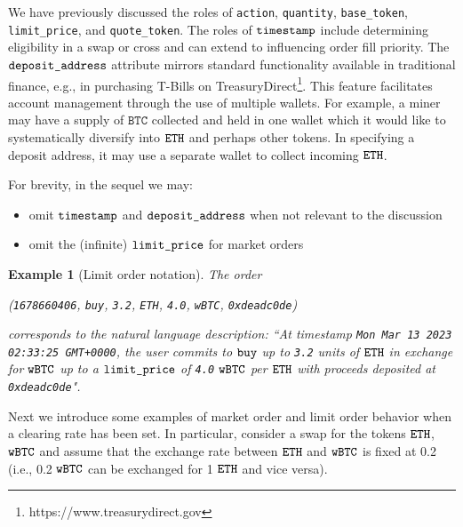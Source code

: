 \documentclass[11pt, reqno]{amsart}
\newtheorem{example}[thm]{Example}
\newcommand{\BTC}{\textnormal{\texttt{wBTC}}}
\newcommand{\ETH}{\textnormal{\texttt{ETH}}}
\newcommand{\timestamp}{\textnormal{\texttt{timestamp}}}
\newcommand{\action}{\textnormal{\texttt{action}}}
\newcommand{\quantity}{\textnormal{\texttt{quantity}}}
\newcommand{\basetoken}{\textnormal{\texttt{base\_token}}}
\newcommand{\limitprice}{\textnormal{\texttt{limit\_price}}}
\newcommand{\quotetoken}{\textnormal{\texttt{quote\_token}}}
\newcommand{\depositaddress}{\textnormal{\texttt{deposit\_address}}}
\newcommand{\buy}{\textnormal{\texttt{buy}}}
\begin{document}
We have previously discussed the roles of \action, \quantity, \basetoken,
\limitprice, and \quotetoken.
The roles of $\timestamp$ include determining eligibility in a swap or
cross and can extend to influencing order fill priority.
The $\depositaddress$ attribute mirrors standard functionality
available in traditional finance, e.g., in purchasing T-Bills on
TreasuryDirect\footnote{https://www.treasurydirect.gov}. This feature
facilitates account management through the use of multiple wallets. For
example, a miner may have a supply of $\texttt{BTC}$ collected and held in one wallet
which it would like to systematically diversify into $\ETH$ and perhaps other
tokens. In specifying a deposit address, it may use a separate wallet to collect
incoming $\ETH$.

For brevity, in the sequel we may:
\begin{itemize}
	\item omit $\timestamp$ and $\depositaddress$ when not relevant to the
	      discussion
	\item omit the (infinite) $\limitprice$ for market orders
\end{itemize}

\begin{example}[Limit order notation]
The order
\begin{center}
    (\textnormal{\texttt{1678660406}},
    \buy,
    \textnormal{\texttt{3.2}},
    \ETH,
    \textnormal{\texttt{4.0}},
    \BTC,
    \textnormal{\texttt{0xdeadc0de}})
\end{center}
corresponds to the natural language description:
``At timestamp \textnormal{\texttt{Mon Mar 13 2023 02:33:25 GMT+0000}}, the user
commits to $\buy$ up to \textnormal{\texttt{3.2}} units of $\ETH$ in exchange
for $\BTC$ up to a $\limitprice$ of \textnormal{\texttt{4.0}} $\BTC$ per $\ETH$
with proceeds deposited at \textnormal{\texttt{0xdeadc0de}}".
\end{example}

Next we introduce some examples of market order and limit order behavior when
a clearing rate has been set.
In particular, consider a swap for the tokens $\ETH$, $\BTC$ and assume that
the exchange rate between $\ETH$ and $\BTC$ is fixed at 0.2 (i.e.,
0.2 $\BTC$ can be exchanged for 1 $\ETH$ and vice versa).
\end{document}
